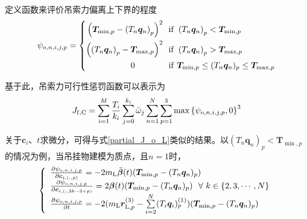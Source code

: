 定义函数来评价吊索力偏离上下界的程度
\begin{equation}
    \psi_{{\rm{o}},n,i,j,p} = \left\{
        \begin{aligned}
            \left(\boldsymbol{T}_{\min, p} - \left(T_n\boldsymbol{q}_n\right)_p \right)^2 \,\,\,\, &{\rm{if}} \,\, \left(T_n\boldsymbol{q}_n\right)_p < \boldsymbol{T}_{\min, p}\\
            \left(\left(T_n\boldsymbol{q}_n\right)_p - \boldsymbol{T}_{\max, p} \right)^2 \,\,\,\, &{\rm{if}} \,\, \left(T_n\boldsymbol{q}_n\right)_p > \boldsymbol{T}_{\max, p}\\
            0 \,\,\,\,\,\,\,\,\,\,\,\,\,\,\,\,\,\,\,\,\,\,\,\,  &{\rm{if}} \,\, \boldsymbol{T}_{\min,p} \le (T_n\boldsymbol{q}_n)_p \le \boldsymbol{T}_{\max,p}\\
        \end{aligned}
    \right.
\end{equation}

基于此，吊索力可行性惩罚函数可以表示为
\begin{equation}
    J_{{\rm{f,C}}} = \sum\limits_{i=1}^{M}\frac{T_i}{k_i}\sum\limits_{j=0}^{k_i}\bar{\omega}_j \sum\limits_{n=1}^N \sum\limits_{p=1}^{3}\max\left\{
        \psi_{{\rm{o}}, n,i,j,p} ,0
    \right\}^3
\end{equation}

关于$\boldsymbol{c}_i$、$t$求微分，可得与式\ref{partial_J_o_L}类似的结果。以$\left(T_n\boldsymbol{q}_n\right)_p < \boldsymbol{T}_{\min, p}$的情况为例，当吊挂物建模为质点，且$n=1$时，
\begin{equation}
    \left\{\begin{array}{l}
        \frac{\partial \psi_{{\rm{o}}, n,i,j,p}}{\partial \boldsymbol{c}_{i,(:,p)}} = -2m_{\rm{L}}\ddot{\boldsymbol{\beta}}(t)(\boldsymbol{T}_{\min, p} - (T_n\boldsymbol{q}_n)_p)\\
        \frac{\partial \psi_{{\rm{o}}, n,i,j,p}}{\partial \boldsymbol{c}_{i,(:,3k-3+p)}} = 2{\boldsymbol{\beta}}(t)(\boldsymbol{T}_{\min, p} - (T_n\boldsymbol{q}_n)_p) \,\,\,\, \forall \,\, k \in \left\{ 2, 3, \cdots, N \right\}\\
        \frac{\partial \psi_{{\rm{o}}, n,i,j,p}}{\partial t} = -2(
            m_{\rm{L}}\boldsymbol{r}_{{\rm{L}}, p}^{(3)} - \sum\limits_{i=2}^{N}(T_i\boldsymbol{q}_i)^{(1)}_p
        )(\boldsymbol{T}_{\min, p} - (T_n\boldsymbol{q}_n)_p)
    \end{array}
    \right.
\end{equation}

